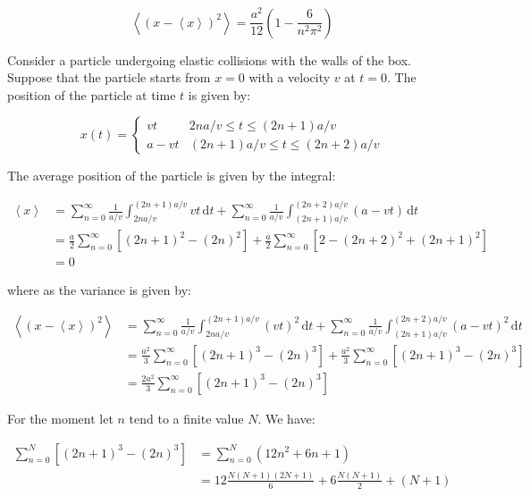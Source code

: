 \documentclass[12pt]{article}
\begin{document}
\begin{equation}
    \left\langle (x - \left\langle x \right\rangle)^{2} \right\rangle = \frac{a^{2}}{12} \left( 1 - \frac{6}{n^{2}\pi^{2}} \right)
\end{equation}

Consider a particle undergoing elastic collisions with the walls of the box. Suppose that the particle starts from $x = 0$ with a velocity $v$ at $t = 0$. The position of the particle at time $t$ is given by:

\begin{equation}
    x(t) = 
    \begin{cases}
        vt & 2na/v \leq t \leq (2n + 1)a/v \\
        a - vt & (2n + 1)a/v \leq t \leq (2n + 2)a/v
    \end{cases}
\end{equation}

The average position of the particle is given by the integral:

\begin{equation}
\begin{split}
    \left\langle x \right\rangle &= \sum_{n = 0}^{\infty} \frac{1}{a/v} \int_{2na/v}^{(2n + 1)a/v} vt \, \mathrm{d}t + \sum_{n = 0}^{\infty} \frac{1}{a/v} \int_{(2n + 1)a/v}^{(2n + 2)a/v} (a - vt) \, \mathrm{d}t \\
    &= \frac{a}{2} \sum_{n = 0}^{\infty} \left[ (2n + 1)^{2} - (2n)^{2} \right] + \frac{a}{2} \sum_{n = 0}^{\infty} \left[ 2 - (2n + 2)^{2} + (2n + 1)^{2} \right] \\
    &= 0
\end{split}
\end{equation}

where as the variance is given by:

\begin{equation}
\begin{split}
    \left\langle (x - \left\langle x \right\rangle)^{2} \right\rangle &= \sum_{n = 0}^{\infty} \frac{1}{a/v} \int_{2na/v}^{(2n + 1)a/v} (vt)^{2} \, \mathrm{d}t + \sum_{n = 0}^{\infty} \frac{1}{a/v} \int_{(2n + 1)a/v}^{(2n + 2)a/v} (a - vt)^{2} \, \mathrm{d}t \\
    &= \frac{a^{2}}{3} \sum_{n = 0}^{\infty} \left[ (2n + 1)^{3} - (2n)^{3} \right] + \frac{a^{2}}{3} \sum_{n = 0}^{\infty} \left[ (2n + 1)^{3} - (2n)^{3} \right] \\
    &= \frac{2a^{2}}{3} \sum_{n = 0}^{\infty} \left[ (2n + 1)^{3} - (2n)^{3} \right]
\end{split}
\end{equation}

For the moment let $n$ tend to a finite value $N$. We have:

\begin{equation}
\begin{split}
    \sum_{n = 0}^{N} \left[ (2n + 1)^{3} - (2n)^{3} \right] &= \sum_{n = 0}^{N} \left( 12n^{2} + 6n + 1 \right) \\
    &= 12 \frac{N(N + 1)(2N + 1)}{6} + 6 \frac{N(N + 1)}{2} + (N + 1) \\
\end{split}
\end{equation}
\end{document}
